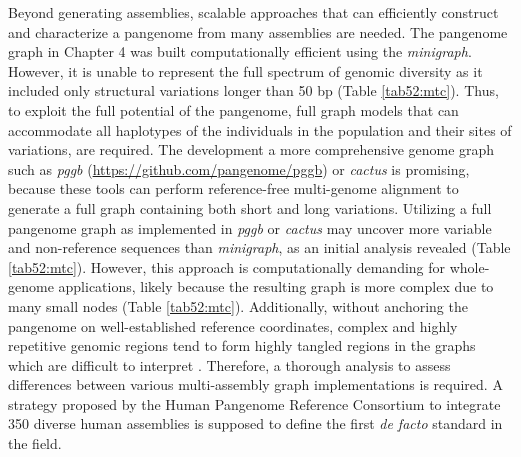 \documentclass[../main.tex]{subfiles}
\begin{document}
Beyond generating assemblies, scalable approaches that can efficiently construct and characterize a pangenome from many assemblies are needed. The pangenome graph in Chapter 4 was built computationally efficient using the \emph{minigraph}. However, it is unable to represent the full spectrum of genomic diversity as it included only structural variations longer than 50 bp (Table \ref{tab52:mtc}). Thus, to exploit the full potential of the pangenome, full graph models that can accommodate all haplotypes of the individuals in the population and their sites of variations, are required. The development a more comprehensive genome graph such as \emph{pggb} (\url{https://github.com/pangenome/pggb}) or \emph{cactus} \citep{armstrong2020progressive} is promising, because these tools can perform reference-free multi-genome alignment to generate a full graph containing both short and long variations. Utilizing a full pangenome graph as implemented in \emph{pggb} or \emph{cactus} may uncover more variable and non-reference sequences than \emph{minigraph}, as an initial analysis revealed (Table \ref{tab52:mtc}). However, this approach is computationally demanding for whole-genome applications, likely because the resulting graph is more complex due to many small nodes (Table \ref{tab52:mtc}). Additionally, without anchoring the pangenome on well-established reference coordinates, complex and highly repetitive genomic regions tend to form highly tangled regions in the graphs which are difficult to interpret \citep{lei2021plant}. Therefore, a thorough analysis to assess differences between various multi-assembly graph implementations is required. A strategy proposed by the Human Pangenome Reference Consortium to integrate 350 diverse human assemblies is supposed to define the first \emph{de facto} standard in the field. 
\vspace{1em}
\end{document}
